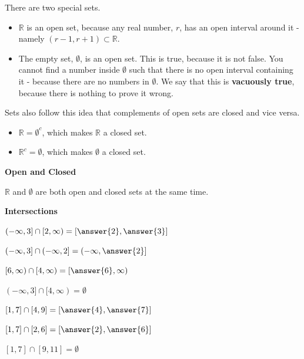 \documentclass{ximera}
\begin{document}
There are two special sets.

\begin{itemize}
\item $\mathbb{R}$  is an open set, because any real number, $r$, has an open interval around it - namely $(r-1, r+1) \subset \mathbb{R}$.
\item The empty set, $\emptyset$, is an open set.  This is true, because it is not false.  You cannot find a number inside $\emptyset$ such that there is no open interval containing it - because there are no numbers in $\emptyset$.  We say that this is \textbf{vacuously true}, because there is nothing to prove it wrong.
\end{itemize}





Sets also follow this idea that complements of open sets are closed and vice versa.

\begin{itemize}
\item $\mathbb{R} = \emptyset^c$, which makes $\mathbb{R}$ a closed set.
\item $\mathbb{R}^c = \emptyset$, which makes $\emptyset$ a closed set.
\end{itemize}





\begin{fact}  \textbf{\textcolor{red!75!green!50}{Open and Closed}} 

$\mathbb{R}$ and $\emptyset$ are both open and closed sets at the same time.


\end{fact}






\begin{observation} \textbf{\textcolor{-red!75}{Intersections}} 

$(-\infty, 3] \cap  [2, \infty) = \left[\answer{2}, \answer{3}\right]$

$(-\infty, 3] \cap  (-\infty, 2] = \left(-\infty, \answer{2}\right]$

$[6, \infty)  \cap  [4, \infty) = \left[\answer{6}, \infty\right)$

$(-\infty, 3] \cap  [4, \infty) = \emptyset$ 






$[1, 7] \cap  [4, 9] = \left[\answer{4}, \answer{7}\right]$

$[1, 7] \cap  [2, 6] = \left[\answer{2}, \answer{6}\right]$

$[1, 7] \cap  [9, 11] = \emptyset$


\end{observation}
\end{document}
